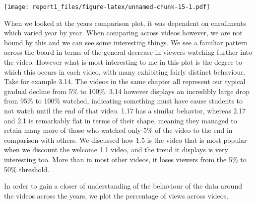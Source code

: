 \documentclass[
]{article}
\newenvironment{Shaded}{\begin{snugshade}}{\end{snugshade}}
\newcommand{\DataTypeTok}[1]{\textcolor[rgb]{0.13,0.29,0.53}{#1}}
\newcommand{\KeywordTok}[1]{\textcolor[rgb]{0.13,0.29,0.53}{\textbf{#1}}}
\newcommand{\NormalTok}[1]{#1}
\newcommand{\OperatorTok}[1]{\textcolor[rgb]{0.81,0.36,0.00}{\textbf{#1}}}
\newcommand{\StringTok}[1]{\textcolor[rgb]{0.31,0.60,0.02}{#1}}
\begin{document}
\begin{Shaded}
\begin{Highlighting}[]
{{{\KeywordTok{ggplot}\NormalTok{(datas, }\KeywordTok{aes}\NormalTok{(}\DataTypeTok{fill=}\NormalTok{perwatched, }\DataTypeTok{y=}\NormalTok{values, }\DataTypeTok{x=}\NormalTok{videos)) }\OperatorTok{+}\StringTok{ }
\StringTok{  }\KeywordTok{geom_bar}\NormalTok{(}\DataTypeTok{position=}\StringTok{"dodge"}\NormalTok{, }\DataTypeTok{stat=}\StringTok{"identity"}\NormalTok{) }\OperatorTok{+}\StringTok{ }
\StringTok{  }\KeywordTok{labs}\NormalTok{(}\DataTypeTok{x=}\StringTok{"Video"}\NormalTok{,}\DataTypeTok{y=}\StringTok{"Views"}\NormalTok{) }\OperatorTok{+}\StringTok{ }
\StringTok{  }\KeywordTok{labs}\NormalTok{(}\DataTypeTok{fill =} \StringTok{"% watched"}\NormalTok{)}
\end{Highlighting}
\end{Shaded}

\texttt{[image: report1\_files/figure-latex/unnamed-chunk-15-1.pdf]}

When we looked at the years comparison plot, it was dependent on
enrollments which varied year by year. When comparing across videos
however, we are not bound by this and we can see some interesting
things. We see a familiar pattern across the board in terms of the
general decrease in viewers watching further into the video. However
what is most interesting to me in this plot is the degree to which this
occurs in each video, with many exhibiting fairly distinct behaviour.
Take for example 3.14. The videos in the same chapter all represent our
typical gradual decline from 5\% to 100\%. 3.14 however displays an
incredibly large drop from 95\% to 100\% watched, indicating something
must have cause students to not watch until the end of that video. 1.17
has a similar behavior, whereas 2.17 and 2.1 is remarkably flat in terms
of their shape, meaning they managed to retain many more of those who
watched only 5\% of the video to the end in comparison with others. We
discussed how 1.5 is the video that is most popular when we discount the
welcome 1.1 video, and the trend it displays is very interesting too.
More than in most other videos, it loses viewers from the 5\% to 50\%
threshold.

In order to gain a closer of understanding of the behaviour of the data
around the videos across the years, we plot the percentage of views
across videos.
\end{document}
